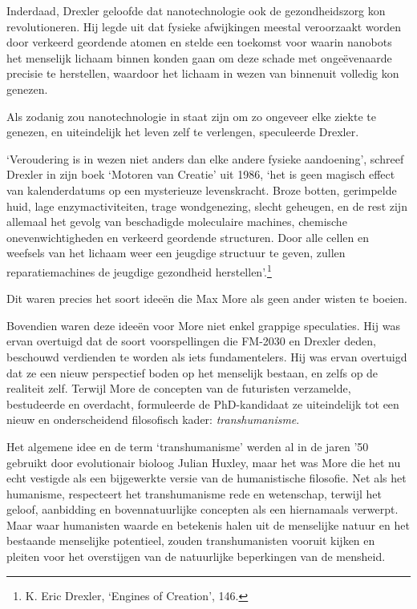 \documentclass[smalldemyvopaper,11pt,twoside,onecolumn,openright,extrafontsizes,hidelinks]{memoir}
\begin{document}
Inderdaad, Drexler geloofde dat nanotechnologie ook de gezondheidszorg
kon revolutioneren. Hij legde uit dat fysieke afwijkingen meestal
veroorzaakt worden door verkeerd geordende atomen en stelde een toekomst
voor waarin nanobots het menselijk lichaam binnen konden gaan om deze
schade met ongeëvenaarde precisie te herstellen, waardoor het lichaam in
wezen van binnenuit volledig kon genezen.

Als zodanig zou nanotechnologie in staat zijn om zo ongeveer elke ziekte
te genezen, en uiteindelijk het leven zelf te verlengen, speculeerde
Drexler.

`Veroudering is in wezen niet anders dan elke andere fysieke
aandoening', schreef Drexler in zijn boek `Motoren van Creatie' uit
1986, `het is geen magisch effect van kalenderdatums op een mysterieuze
levenskracht. Broze botten, gerimpelde huid, lage enzymactiviteiten,
trage wondgenezing, slecht geheugen, en de rest zijn allemaal het gevolg
van beschadigde moleculaire machines, chemische onevenwichtigheden en
verkeerd geordende structuren. Door alle cellen en weefsels van het
lichaam weer een jeugdige structuur te geven, zullen reparatiemachines
de jeugdige gezondheid herstellen'.\footnote{K. Eric Drexler, `Engines
  of Creation', 146.}

Dit waren precies het soort ideeën die Max More als geen ander wisten te
boeien.

Bovendien waren deze ideeën voor More niet enkel grappige speculaties.
Hij was ervan overtuigd dat de soort voorspellingen die FM-2030 en
Drexler deden, beschouwd verdienden te worden als iets fundamentelers.
Hij was ervan overtuigd dat ze een nieuw perspectief boden op het
menselijk bestaan, en zelfs op de realiteit zelf. Terwijl More de
concepten van de futuristen verzamelde, bestudeerde en overdacht,
formuleerde de PhD-kandidaat ze uiteindelijk tot een nieuw en
onderscheidend filosofisch kader: \emph{transhumanisme}.

Het algemene idee en de term `transhumanisme' werden al in de jaren '50
gebruikt door evolutionair bioloog Julian Huxley, maar het was More die
het nu echt vestigde als een bijgewerkte versie van de humanistische
filosofie. Net als het humanisme, respecteert het transhumanisme rede en
wetenschap, terwijl het geloof, aanbidding en bovennatuurlijke concepten
als een hiernamaals verwerpt. Maar waar humanisten waarde en betekenis
halen uit de menselijke natuur en het bestaande menselijke potentieel,
zouden transhumanisten vooruit kijken en pleiten voor het overstijgen
van de natuurlijke beperkingen van de mensheid.
\end{document}
